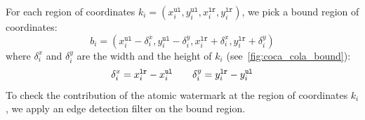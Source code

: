 \documentclass[a4paper,11pt,onecolumn]{memoir}
\begin{document}
For each region of coordinates $k_i = \left(x^{\mathtt{ul}}_i, y^{\mathtt{ul}}_{i},x^{\mathtt{lr}}_i, y^{\mathtt{lr}}_{i}\right)$, we pick a bound region of coordinates:
\begin{equation*}
    b_i =  \left(x^{\mathtt{ul}}_i - \delta^{x}_{i}, y^{\mathtt{ul}}_{i} - \delta^{y}_i ,x^{\mathtt{lr}}_i + \delta^{x}_{i}, y^{\mathtt{lr}}_{i} + \delta^{y}_{i}\right)
\end{equation*}
where $\delta^{x}_{i}$ and $\delta^{y}_{i}$ are the width and the height of $k_i$ (see~\autoref{fig:coca_cola_bound}):
\begin{equation*}
    \delta^{x}_{i} = x^{\mathtt{lr}}_i - x^{\mathtt{ul}}_i \qquad \delta^{y}_{i} = y^{\mathtt{lr}}_i - y^{\mathtt{ul}}_i \\
\end{equation*}
To check the contribution of the atomic watermark at the region of coordinates $k_i$, we apply an edge detection filter on the bound region.
\end{document}
